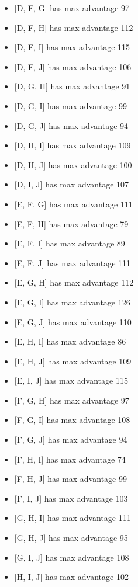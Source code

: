 \begin{puzzleSolutions}
\begin{multicols}{2}
\begin{itemize}
\item{} [D, F, G] has max advantage 97
\item{} [D, F, H] has max advantage 112
\item{} [D, F, I] has max advantage 115
\item{} [D, F, J] has max advantage 106
\item{} [D, G, H] has max advantage 91
\item{} [D, G, I] has max advantage 99
\item{} [D, G, J] has max advantage 94
\item{} [D, H, I] has max advantage 109
\item{} [D, H, J] has max advantage 100
\item{} [D, I, J] has max advantage 107
\item{} [E, F, G] has max advantage 111
\item{} [E, F, H] has max advantage 79
\item{} [E, F, I] has max advantage 89
\item{} [E, F, J] has max advantage 111
\item{} [E, G, H] has max advantage 112
\item{} [E, G, I] has max advantage 126
\item{} [E, G, J] has max advantage 110
\item{} [E, H, I] has max advantage 86
\item{} [E, H, J] has max advantage 109
\item{} [E, I, J] has max advantage 115
\item{} [F, G, H] has max advantage 97
\item{} [F, G, I] has max advantage 108
\item{} [F, G, J] has max advantage 94
\item{} [F, H, I] has max advantage 74
\item{} [F, H, J] has max advantage 99
\item{} [F, I, J] has max advantage 103
\item{} [G, H, I] has max advantage 111
\item{} [G, H, J] has max advantage 95
\item{} [G, I, J] has max advantage 108
\item{} [H, I, J] has max advantage 102
\end{itemize}
\end{multicols}
\end{puzzleSolutions}

